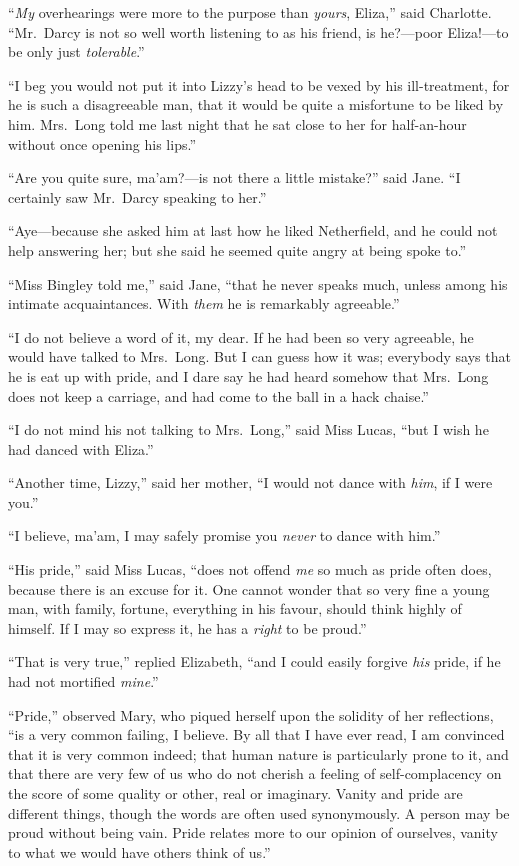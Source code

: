 ``\emph{My} overhearings were more to the purpose than \emph{yours}, Eliza,''
said Charlotte.  ``Mr.\ Darcy is not so well worth listening to
as his friend, is he?---poor Eliza!---to be only just \emph{tolerable}.''

``I beg you would not put it into Lizzy's head to be vexed by
his ill-treatment, for he is such a disagreeable man, that it
would be quite a misfortune to be liked by him.  Mrs.\ Long
told me last night that he sat close to her for half-an-hour
without once opening his lips.''

``Are you quite sure, ma'am?---is not there a little mistake?''
said Jane.  ``I certainly saw Mr.\ Darcy speaking to her.''

``Aye---because she asked him at last how he liked Netherfield,
and he could not help answering her; but she said he seemed
quite angry at being spoke to.''

``Miss Bingley told me,'' said Jane, ``that he never speaks much,
unless among his intimate acquaintances.  With \emph{them} he is
remarkably agreeable.''

``I do not believe a word of it, my dear.  If he had been so very
agreeable, he would have talked to Mrs.\ Long.  But I can guess
how it was; everybody says that he is eat up with pride, and I
dare say he had heard somehow that Mrs.\ Long does not keep
a carriage, and had come to the ball in a hack chaise.''

``I do not mind his not talking to Mrs.\ Long,'' said Miss Lucas,
``but I wish he had danced with Eliza.''

``Another time, Lizzy,'' said her mother, ``I would not dance
with \emph{him}, if I were you.''

``I believe, ma'am, I may safely promise you \emph{never} to dance
with him.''

``His pride,'' said Miss Lucas, ``does not offend \emph{me} so much as
pride often does, because there is an excuse for it.  One cannot
wonder that so very fine a young man, with family, fortune,
everything in his favour, should think highly of himself.  If I
may so express it, he has a \emph{right} to be proud.''

``That is very true,'' replied Elizabeth, ``and I could easily
forgive \emph{his} pride, if he had not mortified \emph{mine}.''

``Pride,'' observed Mary, who piqued herself upon the solidity
of her reflections, ``is a very common failing, I believe.  By
all that I have ever read, I am convinced that it is very common
indeed; that human nature is particularly prone to it, and
that there are very few of us who do not cherish a feeling of
self-complacency on the score of some quality or other, real
or imaginary.  Vanity and pride are different things, though
the words are often used synonymously.  A person may be proud
without being vain.  Pride relates more to our opinion of
ourselves, vanity to what we would have others think of us.''


